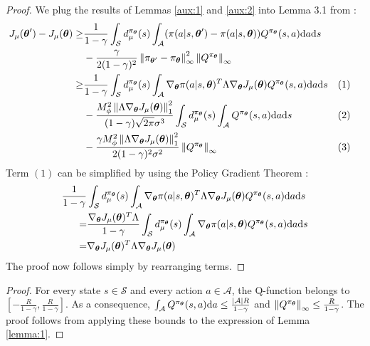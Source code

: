 \firstlemma*
\begin{proof}
We plug the results of Lemmas \ref{aux:1} and \ref{aux:2} into Lemma 3.1 from \cite{NIPS2013_5186}:
\begin{align*}
J_{\mu}(\vtheta') - J_{\mu}(\vtheta) \geq  
	& \frac{1}{1-\gamma} \int_{\mathcal{S}}d_{\mu}^{\pi_{\vtheta}}(s)
	\int_{\mathcal{A}} (\pi(a|s,\vtheta') - \pi(a|s,\vtheta))Q^{\pi_{\vtheta}}(s,a)\mathrm{d}a\mathrm{d}s \\
	& -\frac{\gamma}{2(1-\gamma)^2} \norm[\infty]{\pi_{\vtheta'}-\pi_{\vtheta}}^2 \norm[\infty]{Q^{\pi_{\vtheta}}} \\
	\geq & 
		\frac{1}{1-\gamma} \int_{\mathcal{S}}d_{\mu}^{\pi_{\vtheta}}(s)
		\int_{\mathcal{A}}
		\nabla_{\vtheta}\pi(a|s,\vtheta)^T\Lambda\gradJ{\vtheta}
		Q^{\pi_{\vtheta}}(s,a)\mathrm{d}a\mathrm{d}s && (1) \\
		& - \frac{M_{\phi}^2\norm[1]{\Lambda\gradJ{\vtheta}}^2}
		{(1-\gamma)\sqrt{2\pi}\sigma^3}
		\int_{\mathcal{S}}d_{\mu}^{\pi_{\vtheta}}(s)
		\int_{\mathcal{A}} 
		Q^{\pi_{\vtheta}}(s,a)\mathrm{d}a\mathrm{d}s && (2) \\ 
		&  -\frac{\gamma M_{\phi}^2\norm[1]{\Lambda\gradJ{\vtheta}}^2}
		{2(1-\gamma)^2\sigma^2}\norm[\infty]{Q^{\pi_{\vtheta}}}	&& (3)
\end{align*}
Term $(1)$ can be simplified by using the Policy Gradient Theorem \cite{NIPS1999_1713}:
\begin{align*}
\frac{1}{1-\gamma} &  \int_{\mathcal{S}}d_{\mu}^{\pi_{\vtheta}}(s)
		\int_{\mathcal{A}}
		\nabla_{\vtheta}\pi(a|s,\vtheta)^T\Lambda\gradJ{\vtheta}
		Q^{\pi_{\vtheta}}(s,a)\mathrm{d}a\mathrm{d}s \\
		= & \frac{\gradJ{\vtheta}^T\Lambda}{1-\gamma}
		\int_{\mathcal{S}}d_{\mu}^{\pi_{\vtheta}}(s)
		\int_{\mathcal{A}}
		\nabla_{\vtheta}\pi(a|s,\vtheta)Q^{\pi_{\vtheta}}(s,a)\mathrm{d}a\mathrm{d}s \\
		= & \gradJ{\vtheta}^T\Lambda\gradJ{\vtheta}
\end{align*}
The proof now follows simply by rearranging terms.
\end{proof}


\firsttheorem*
\begin{proof}
For every state $s \in \mathcal{S}$ and every action $a \in \mathcal{A}$, the Q-function belongs to $\left[-\frac{R}{1-\gamma},\frac{R}{1-\gamma}\right]$. As a consequence, $\int_{\mathcal{A}}Q^{\pi_{\vtheta}}(s,a)\mathrm{d}a \leq \frac{|\mathcal{A}|R}{1-\gamma}$ and $\norm[\infty]{Q^{\pi_{\vtheta}}} \leq \frac{R}{1-\gamma}$. The proof follows from applying these bounds to the expression of Lemma \ref{lemma:1}.
\end{proof}


